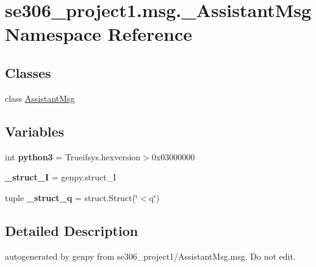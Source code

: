 \hypertarget{namespacese306__project1_1_1msg_1_1__AssistantMsg}{\section{se306\-\_\-project1.\-msg.\-\_\-\-Assistant\-Msg Namespace Reference}
\label{namespacese306__project1_1_1msg_1_1__AssistantMsg}
}
\subsection*{Classes}
\begin{DoxyCompactItemize}
\item 
class \hyperlink{classse306__project1_1_1msg_1_1__AssistantMsg_1_1AssistantMsg}{Assistant\-Msg}
\end{DoxyCompactItemize}
\subsection*{Variables}
\begin{DoxyCompactItemize}
\item 
\hypertarget{namespacese306__project1_1_1msg_1_1__AssistantMsg_af876ad1bcd23a114cb3d84df098ca1d3}{int {\bfseries python3} = Trueifsys.\-hexversion$>$0x03000000}\label{namespacese306__project1_1_1msg_1_1__AssistantMsg_af876ad1bcd23a114cb3d84df098ca1d3}

\item 
\hypertarget{namespacese306__project1_1_1msg_1_1__AssistantMsg_ab3f40acfd3fd1563a2871472bb647419}{{\bfseries \-\_\-struct\-\_\-\-I} = genpy.\-struct\-\_\-\-I}\label{namespacese306__project1_1_1msg_1_1__AssistantMsg_ab3f40acfd3fd1563a2871472bb647419}

\item 
\hypertarget{namespacese306__project1_1_1msg_1_1__AssistantMsg_a3812b853be34bf70b3c09c439e234fc2}{tuple {\bfseries \-\_\-struct\-\_\-q} = struct.\-Struct(\char`\"{}$<$q\char`\"{})}\label{namespacese306__project1_1_1msg_1_1__AssistantMsg_a3812b853be34bf70b3c09c439e234fc2}

\end{DoxyCompactItemize}


\subsection{Detailed Description}
\begin{DoxyVerb}autogenerated by genpy from se306_project1/AssistantMsg.msg. Do not edit.\end{DoxyVerb}
 
